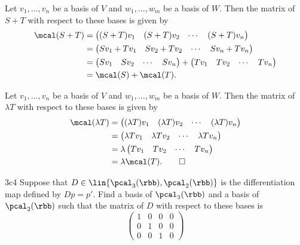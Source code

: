 \begin{solenum}
    \item Let $v_1, \ldots, v_n$ be a basis of $V$ and $w_1, \ldots, w_m$ be a basis of $W$.
	Then the matrix of $S + T$ with respect to these bases is given by
    \begin{align*}
        \mcal(S + T) & = 
        \begin{pmatrix}
            (S + T)v_1 & (S + T)v_2 & \cdots & (S + T)v_n
        \end{pmatrix} \\
        & = 
        \begin{pmatrix}
            Sv_1 + Tv_1 & Sv_2 + Tv_2 & \cdots & Sv_n + Tv_n
        \end{pmatrix} \\
        & = 
        \begin{pmatrix}
            Sv_1 & Sv_2 & \cdots & Sv_n
        \end{pmatrix} +
        \begin{pmatrix}
            Tv_1 & Tv_2 & \cdots & Tv_n
        \end{pmatrix} \\
        & = \mcal(S) + \mcal(T).
    \end{align*}
    \item Let $v_1, \ldots, v_n$ be a basis of $V$ and $w_1, \ldots, w_m$ be a basis of $W$.
	Then the matrix of $\lambda T$ with respect to these bases is given by
    \begin{align*}
        \mcal(\lambda T) & = 
        \begin{pmatrix}
            (\lambda T)v_1 & (\lambda T)v_2 & \cdots & (\lambda T)v_n
        \end{pmatrix} \\
        & = 
        \begin{pmatrix}
            \lambda Tv_1 & \lambda Tv_2 & \cdots & \lambda Tv_n
        \end{pmatrix} \\
        & = \lambda
        \begin{pmatrix}
            Tv_1 & Tv_2 & \cdots & Tv_n
        \end{pmatrix} \\
        & = \lambda \mcal(T). \qedhere
    \end{align*}
\end{solenum}

\begin{exercise}{3c4}
    Suppose that $D \in \lin{\pcal_3(\rbb), \pcal_2(\rbb)}$ is the differentiation map defined by $Dp = p'$.
	Find a basis of $\pcal_3(\rbb)$ and a basis of $\pcal_2(\rbb)$ such that the matrix of $D$ with respect to these bases is
    \[
        \begin{pmatrix}
            1 & 0 & 0 & 0 \\
            0 & 1 & 0 & 0 \\
            0 & 0 & 1 & 0
        \end{pmatrix}
    \]
\end{exercise}

